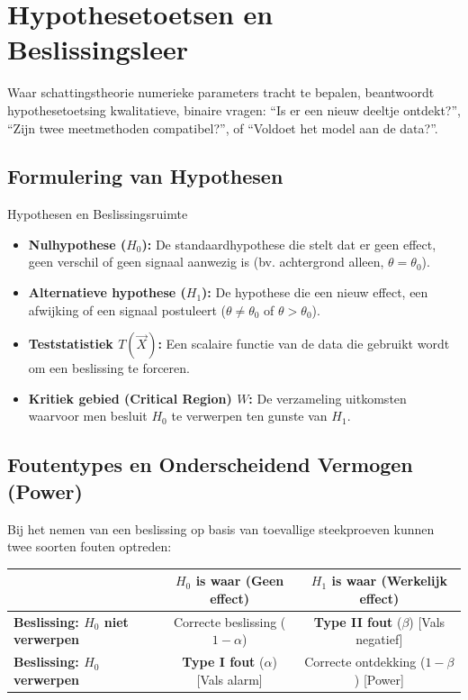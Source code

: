 \documentclass[11pt,a4paper]{article}
\begin{document}
\section{Hypothesetoetsen en Beslissingsleer}

Waar schattingstheorie numerieke parameters tracht te bepalen, beantwoordt hypothesetoetsing kwalitatieve, binaire vragen: ``Is er een nieuw deeltje ontdekt?'', ``Zijn twee meetmethoden compatibel?'', of ``Voldoet het model aan de data?''.

\subsection{Formulering van Hypothesen}
\begin{defbox}{Hypothesen en Beslissingsruimte}
\begin{itemize}[leftmargin=1.2em]
    \item \textbf{Nulhypothese ($H_0$):} De standaardhypothese die stelt dat er geen effect, geen verschil of geen signaal aanwezig is (bv. achtergrond alleen, $\theta = \theta_0$).
    \item \textbf{Alternatieve hypothese ($H_1$):} De hypothese die een nieuw effect, een afwijking of een signaal postuleert ($\theta \neq \theta_0$ of $\theta > \theta_0$).
    \item \textbf{Teststatistiek $T(\vec{X})$:} Een scalaire functie van de data die gebruikt wordt om een beslissing te forceren.
    \item \textbf{Kritiek gebied (Critical Region) $W$:} De verzameling uitkomsten waarvoor men besluit $H_0$ te verwerpen ten gunste van $H_1$.
\end{itemize}
\end{defbox}

\subsection{Foutentypes en Onderscheidend Vermogen (Power)}
Bij het nemen van een beslissing op basis van toevallige steekproeven kunnen twee soorten fouten optreden:

\begin{center}
    \small
    \begin{tabular}{lcc}
        \toprule
        & \textbf{$H_0$ is waar} (Geen effect) & \textbf{$H_1$ is waar} (Werkelijk effect) \\
        \midrule
        \textbf{Beslissing: $H_0$ niet verwerpen} & Correcte beslissing ($1 - \alpha$) & \textbf{Type II fout} ($\beta$) [Vals negatief] \\
        \textbf{Beslissing: $H_0$ verwerpen} & \textbf{Type I fout} ($\alpha$) [Vals alarm] & Correcte ontdekking ($1 - \beta$) [Power] \\
        \bottomrule
    \end{tabular}
\end{center}
\end{document}
